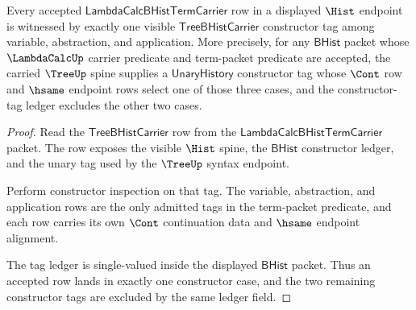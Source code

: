 \begin{theorem}
\label{thm:lambdacalc-constructor-case-exhaustion}
Every accepted $\mathsf{LambdaCalcBHistTermCarrier}$ row in a displayed
$\Hist$ endpoint is witnessed by exactly one visible
$\mathsf{TreeBHistCarrier}$ constructor tag among variable, abstraction, and
application. More precisely, for any $\mathsf{BHist}$ packet whose
$\LambdaCalcUp$ carrier predicate and term-packet predicate are accepted, the
carried $\TreeUp$ spine supplies a $\mathsf{UnaryHistory}$ constructor tag
whose $\Cont$ row and $\hsame$ endpoint rows select one of those three cases,
and the constructor-tag ledger excludes the other two cases.
\end{theorem}
\begin{proof}
Read the $\mathsf{TreeBHistCarrier}$ row from the
$\mathsf{LambdaCalcBHistTermCarrier}$ packet. The row exposes the visible
$\Hist$ spine, the $\mathsf{BHist}$ constructor ledger, and the unary tag used
by the $\TreeUp$ syntax endpoint.

Perform constructor inspection on that tag. The variable, abstraction, and
application rows are the only admitted tags in the term-packet predicate, and
each row carries its own $\Cont$ continuation data and $\hsame$ endpoint
alignment.

The tag ledger is single-valued inside the displayed $\mathsf{BHist}$ packet.
Thus an accepted row lands in exactly one constructor case, and the two
remaining constructor tags are excluded by the same ledger field.
\end{proof}


